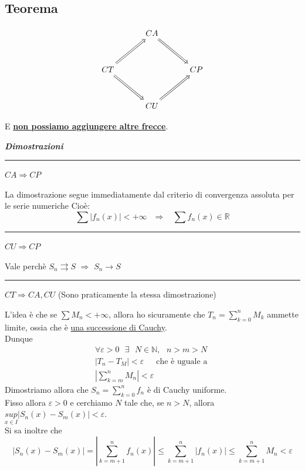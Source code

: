 \documentclass{article}
\theoremstyle{definition}
\newcommand{\linea}{\vspace{15pt}\hrule\vspace{15pt}}
\newcommand{\R}{\mathbb{R}}
\newcommand{\N}{\mathbb{N}}
\begin{document}
\subsection{Teorema}
\[
\begin{tikzcd}[row sep=3em, column sep=3em]
  & CA \arrow[dr, Rightarrow] & \\
CT \arrow[ur, Rightarrow] \arrow[dr, Rightarrow] & & CP \\
  & CU \arrow[ur, Rightarrow] &
\end{tikzcd}
\]


E \underline{\textbf{non possiamo aggiungere altre frecce}}.
\begin{center}
    \textbf{\textit{Dimostrazioni}}
\end{center}
\linea
\begin{center}
    $CA \Longrightarrow CP$
\end{center}
La dimostrazione segue immediatamente dal criterio di convergenza assoluta per le serie numeriche
Cioè:
\begin{equation}
    \sum|f_n(x)| < +\infty \,\,\,\ \Longrightarrow \,\,\,\,\ \sum f_n(x) \in \R
\end{equation}
\linea
\begin{center}
    $CU \Longrightarrow CP$
\end{center}
Vale perchè $S_n \rightrightarrows S$ $\Longrightarrow $ $S_n \to S$
\linea
\begin{center}
    $CT \Longrightarrow CA, CU$ (Sono praticamente la stessa dimostrazione)
\end{center}
L'idea è che se $\sum M_n < +\infty$, allora ho sicuramente che $T_n=\sum_{k=0}^n M_k$ ammette limite, ossia che è \underline{una successione di Cauchy}.
\\
Dunque
\begin{align}
    \forall \varepsilon >  0 \,\,\,\, \exists \,\,\,\, N \in \N, \,\,\,\, n>m>N \\
    \left|T_n - T_M\right| < \varepsilon \,\,\,\,\,\,\,\,\, \mbox{che è uguale a }\\ 
    \left|\sum_{k=m}^n M_n\right| < \varepsilon
\end{align}
Dimostriamo allora che $S_n=\sum_{k=0}^n f_n$ è di Cauchy uniforme.
\\
Fisso allora $\varepsilon > 0$ e cerchiamo $N$ tale che, se $n > N$, allora $\underset{x \in I}{sup}|S_n(x)-S_m(x)|< \varepsilon$.
\\
Si sa inoltre che \begin{equation}
    |S_n(x)-S_m(x)|= \left|\sum_{k=m+1}^n f_n(x)\right| \leqslant \sum_{k=m+1}^n \left|f_n(x)\right| \leqslant \sum_{k=m+1}^n M_n < \varepsilon
\end{equation}
\end{document}
